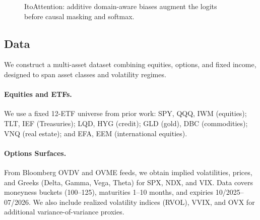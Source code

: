 \documentclass[10pt,twocolumn]{article}
\begin{document}
\begin{figure}[H]
{
}
\caption{ItoAttention: additive domain-aware biases augment the logits before causal masking and softmax.}
\label{fig:itoattention}
\end{figure}


\FloatBarrier
\subsection{Data}

We construct a multi-asset dataset combining equities, options, and fixed income, designed to span asset classes and volatility regimes. 

\paragraph{Equities and ETFs.} 
We use a fixed 12-ETF universe from prior work: SPY, QQQ, IWM (equities); TLT, IEF (Treasuries); LQD, HYG (credit); GLD (gold), DBC (commodities); VNQ (real estate); and EFA, EEM (international equities). 

\paragraph{Options Surfaces.}
From Bloomberg OVDV and OVME feeds, we obtain implied volatilities, prices, and Greeks (Delta, Gamma, Vega, Theta) for SPX, NDX, and VIX. Data covers moneyness buckets (100--125), maturities 1--10 months, and expiries 10/2025--07/2026. We also include realized volatility indices (RVOL), VVIX, and OVX for additional variance-of-variance proxies.  
\end{document}
